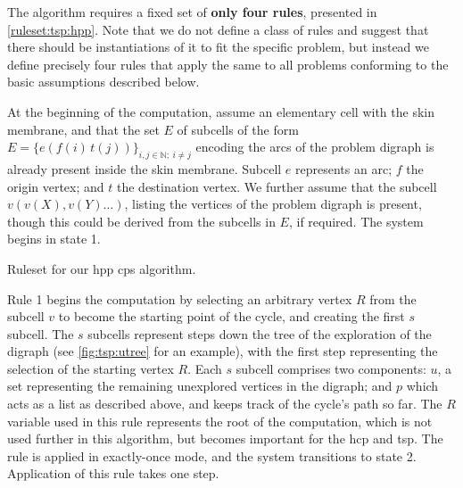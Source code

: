 The algorithm requires a fixed set of \textbf{only four rules}, presented in \autoref{ruleset:tsp:hpp}.  Note that we do not define a class of rules and suggest that there should be instantiations of it to fit the specific problem, but instead we define precisely four rules that apply the same to all problems conforming to the basic assumptions described below.

At the beginning of the computation, assume an elementary cell with the skin membrane, and that the set \(E\) of subcells of the form \(E = \{e(f(i)\,t(j))\}_{i,j \in \mathbb{N}; ~ i \neq j}\) encoding the arcs of the problem digraph is already present inside the skin membrane.  Subcell \(e\) represents an arc; \(f\) the origin vertex; and \(t\) the destination vertex.  We further assume that the subcell \( v(v(X),v(Y)\dots)\), listing the vertices of the problem digraph is present, though this could be derived from the subcells in \(E\), if required.  The system begins in state 1.

\begin{cprulesetfloat}
    \begin{cpruleset}
        
        
        
    \end{cpruleset}
    \caption[Ruleset for the ]{\label{ruleset:tsp:hpp}Ruleset for our \gls{hpp} \gls{cps} algorithm.}
\end{cprulesetfloat}

Rule 1 begins the computation by selecting an arbitrary vertex \(R\) from the subcell \(v\) to become the starting point of the cycle, and creating the first \(s\) subcell.  The \(s\) subcells represent steps down the tree of the exploration of the digraph (see \autoref{fig:tsp:utree} for an example), with the first step representing the selection of the starting vertex \(R\).  Each \(s\) subcell comprises two components: \(u\), a set representing the remaining unexplored vertices in the digraph; and \(p\) which acts as a list as described above, and keeps track of the cycle's path so far.  The \(R\) variable used in this rule represents the root of the computation, which is not used further in this algorithm, but becomes important for the \gls{hcp} and \gls{tsp}.  The rule is applied in exactly-once mode, and the system transitions to state 2.  Application of this rule takes one step.

